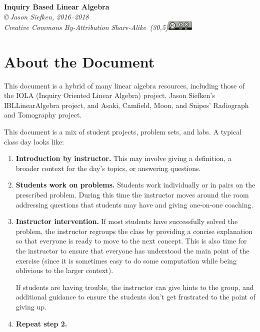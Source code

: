 \documentclass{problemset}
\begin{document}
\pagestyle{empty}

\begin{center}
{\huge\bf Inquiry Based Linear Algebra}\\

\vspace{.7in}
{
\it \copyright\,Jason Siefken, 2016--2018 \\
Creative Commons By-Attribution Share-Alike\, \makebox(30,5){\includegraphics[height=1.2em]{by-sa.pdf}}
}
\end{center}

\section*{About the Document}

This document is a hybrid of many linear algebra resources, including those of
the IOLA (Inquiry Oriented Linear Algebra) project, Jason Siefken's
IBLLinearAlgebra project, and Asaki, Camfield, Moon, and Snipes' Radiograph and
Tomography project.

This document is a mix of student projects, problem sets, and labs. A typical
class day looks like:
\begin{enumerate}
	\item {\bf Introduction by instructor.} This may involve giving a definition,
		a broader context for the day's topics, or answering questions.

	\item {\bf Students work on problems.} Students work individually or in pairs
		on the prescribed problem. During this time the instructor moves
		around the room addressing questions that students may have and giving
		one-on-one coaching.

	\item {\bf Instructor intervention.} If most students have successfully solved
		the problem, the instructor regroups the class by providing a concise
		explanation so that everyone is ready to move to the next concept.
		This is also time for the instructor to ensure that everyone has
		understood the main point of the exercise (since it is sometimes
		easy to do some computation while being oblivious to the larger context).

		If students are having trouble, the instructor can give hints to
		the group, and additional guidance to ensure the students don't get
		frustrated to the point of giving up.

	\item {\bf Repeat step 2.}
\end{enumerate}
\end{document}
